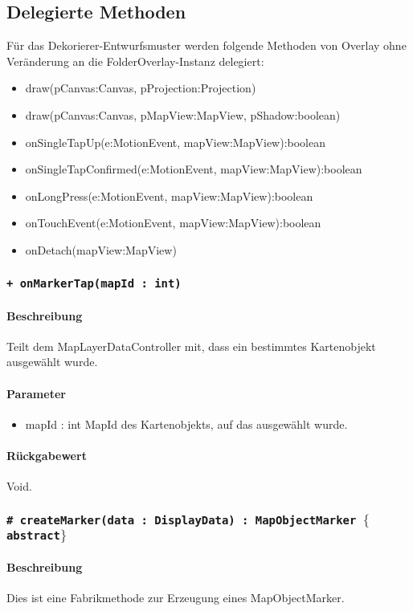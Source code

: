 \subsection{Delegierte Methoden}
Für das Dekorierer-Entwurfsmuster werden folgende Methoden von Overlay ohne Veränderung 
an die FolderOverlay-Instanz delegiert:
\begin{itemize}
    \item draw(pCanvas:Canvas, pProjection:Projection)
    \item draw(pCanvas:Canvas, pMapView:MapView, pShadow:boolean)
    \item onSingleTapUp(e:MotionEvent, mapView:MapView):boolean
    \item onSingleTapConfirmed(e:MotionEvent, mapView:MapView):boolean
    \item onLongPress(e:MotionEvent, mapView:MapView):boolean
    \item onTouchEvent(e:MotionEvent, mapView:MapView):boolean
    \item onDetach(mapView:MapView)
\end{itemize}

\subsubsection{\texttt{+ onMarkerTap(mapId : int)}}%
\paragraph*{Beschreibung}
Teilt dem MapLayerDataController mit, dass ein bestimmtes Kartenobjekt ausgewählt wurde.
\paragraph*{Parameter}
\begin{itemize}
    \item mapId : int MapId des Kartenobjekts, auf das ausgewählt wurde.
\end{itemize}
\paragraph*{Rückgabewert}
Void.

\subsubsection{\texttt{# createMarker(data : DisplayData) : MapObjectMarker $\lbrace$abstract$\rbrace$}}%
\paragraph*{Beschreibung}
Dies ist eine Fabrikmethode zur Erzeugung eines MapObjectMarker.
